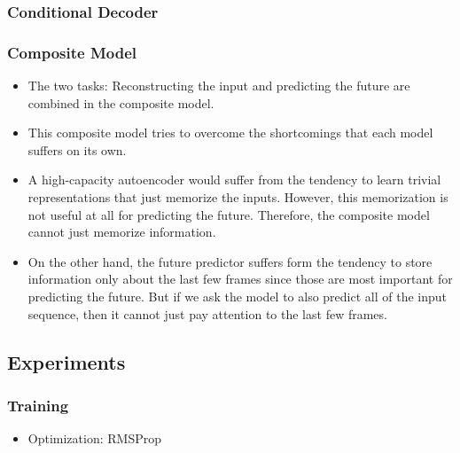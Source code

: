 \documentclass{article}
\begin{document}
    \subsubsection{Conditional Decoder}\label{subsubsec:Unsupervised_Learning_of_Video_Representations_using_LSTMs:conditional-decoder}

    \subsubsection{Composite Model}\label{subsubsec:Unsupervised_Learning_of_Video_Representations_using_LSTMs:composite-model}
    \begin{itemize}
        \item The two tasks: Reconstructing the input and predicting the future are combined in the composite model.
        \item This composite model tries to overcome the shortcomings that each model suffers on its own.
        \item A high-capacity autoencoder would suffer from the tendency to learn trivial representations that just memorize the inputs.
        However, this memorization is not useful at all for predicting the future.
        Therefore, the composite model cannot just memorize information.
        \item On the other hand, the future predictor suffers form the tendency to store information only about the last few frames since those are most important for predicting the future.
        But if we ask the model to also predict all of the input sequence, then it cannot just pay attention to the last few frames.
    \end{itemize}

    \subsection{Experiments}\label{subsec:Unsupervised_Learning_of_Video_Representations_using_LSTMs:experiments}

    \subsubsection{Training}\label{subsubsec:Unsupervised_Learning_of_Video_Representations_using_LSTMs:training}
    \begin{itemize}
        \item Optimization: RMSProp
    \end{itemize}
\end{document}

